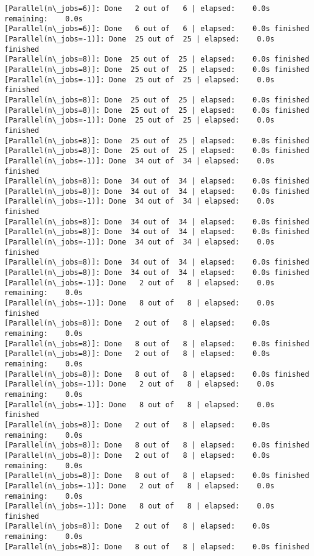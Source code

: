 \documentclass[11pt]{article}
\begin{document}
\begin{Verbatim}[commandchars=\\\{\}]
[Parallel(n\_jobs=6)]: Done   2 out of   6 | elapsed:    0.0s remaining:    0.0s
[Parallel(n\_jobs=6)]: Done   6 out of   6 | elapsed:    0.0s finished
[Parallel(n\_jobs=-1)]: Done  25 out of  25 | elapsed:    0.0s finished
[Parallel(n\_jobs=8)]: Done  25 out of  25 | elapsed:    0.0s finished
[Parallel(n\_jobs=8)]: Done  25 out of  25 | elapsed:    0.0s finished
[Parallel(n\_jobs=-1)]: Done  25 out of  25 | elapsed:    0.0s finished
[Parallel(n\_jobs=8)]: Done  25 out of  25 | elapsed:    0.0s finished
[Parallel(n\_jobs=8)]: Done  25 out of  25 | elapsed:    0.0s finished
[Parallel(n\_jobs=-1)]: Done  25 out of  25 | elapsed:    0.0s finished
[Parallel(n\_jobs=8)]: Done  25 out of  25 | elapsed:    0.0s finished
[Parallel(n\_jobs=8)]: Done  25 out of  25 | elapsed:    0.0s finished
[Parallel(n\_jobs=-1)]: Done  34 out of  34 | elapsed:    0.0s finished
[Parallel(n\_jobs=8)]: Done  34 out of  34 | elapsed:    0.0s finished
[Parallel(n\_jobs=8)]: Done  34 out of  34 | elapsed:    0.0s finished
[Parallel(n\_jobs=-1)]: Done  34 out of  34 | elapsed:    0.0s finished
[Parallel(n\_jobs=8)]: Done  34 out of  34 | elapsed:    0.0s finished
[Parallel(n\_jobs=8)]: Done  34 out of  34 | elapsed:    0.0s finished
[Parallel(n\_jobs=-1)]: Done  34 out of  34 | elapsed:    0.0s finished
[Parallel(n\_jobs=8)]: Done  34 out of  34 | elapsed:    0.0s finished
[Parallel(n\_jobs=8)]: Done  34 out of  34 | elapsed:    0.0s finished
[Parallel(n\_jobs=-1)]: Done   2 out of   8 | elapsed:    0.0s remaining:    0.0s
[Parallel(n\_jobs=-1)]: Done   8 out of   8 | elapsed:    0.0s finished
[Parallel(n\_jobs=8)]: Done   2 out of   8 | elapsed:    0.0s remaining:    0.0s
[Parallel(n\_jobs=8)]: Done   8 out of   8 | elapsed:    0.0s finished
[Parallel(n\_jobs=8)]: Done   2 out of   8 | elapsed:    0.0s remaining:    0.0s
[Parallel(n\_jobs=8)]: Done   8 out of   8 | elapsed:    0.0s finished
[Parallel(n\_jobs=-1)]: Done   2 out of   8 | elapsed:    0.0s remaining:    0.0s
[Parallel(n\_jobs=-1)]: Done   8 out of   8 | elapsed:    0.0s finished
[Parallel(n\_jobs=8)]: Done   2 out of   8 | elapsed:    0.0s remaining:    0.0s
[Parallel(n\_jobs=8)]: Done   8 out of   8 | elapsed:    0.0s finished
[Parallel(n\_jobs=8)]: Done   2 out of   8 | elapsed:    0.0s remaining:    0.0s
[Parallel(n\_jobs=8)]: Done   8 out of   8 | elapsed:    0.0s finished
[Parallel(n\_jobs=-1)]: Done   2 out of   8 | elapsed:    0.0s remaining:    0.0s
[Parallel(n\_jobs=-1)]: Done   8 out of   8 | elapsed:    0.0s finished
[Parallel(n\_jobs=8)]: Done   2 out of   8 | elapsed:    0.0s remaining:    0.0s
[Parallel(n\_jobs=8)]: Done   8 out of   8 | elapsed:    0.0s finished

\end{Verbatim}
\end{document}
